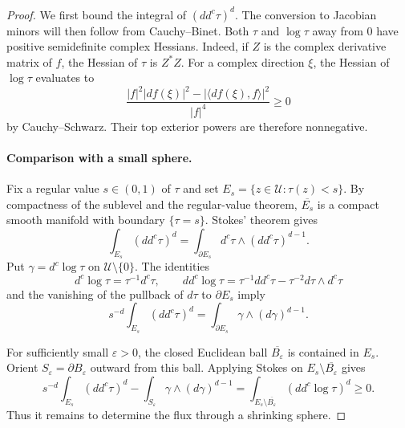 \begin{proof}
We first bound the integral of $(dd^c\tau)^d$. The conversion to Jacobian minors will then follow from Cauchy--Binet. Both $\tau$ and $\log\tau$ away from $0$ have positive semidefinite complex Hessians. Indeed, if $Z$ is the complex derivative matrix of $f$, the Hessian of $\tau$ is $Z^*Z$. For a complex direction $\xi$, the Hessian of $\log\tau$ evaluates to
\[
\frac{|f|^2|df(\xi)|^2
       -|\langle df(\xi),f\rangle|^2}{|f|^4}\geq0
\]
by Cauchy--Schwarz. Their top exterior powers are therefore nonnegative.

\paragraph{Comparison with a small sphere.}
Fix a regular value $s\in(0,1)$ of $\tau$ and set $E_s=\{z\in\mathcal{U}:\tau(z)<s\}$. By compactness of the sublevel and the regular-value theorem, $\overline{E_s}$ is a compact smooth manifold with boundary $\{\tau=s\}$. Stokes' theorem gives
\[
\int_{E_s}(dd^c\tau)^d
 =\int_{\partial E_s}d^c\tau\wedge(dd^c\tau)^{d-1}.
\]
Put $\gamma=d^c\log\tau$ on $\mathcal{U}\setminus\{0\}$. The identities
\[
d^c\log\tau=\tau^{-1}d^c\tau,
\qquad
dd^c\log\tau=\tau^{-1}dd^c\tau
                 -\tau^{-2}d\tau\wedge d^c\tau
\]
and the vanishing of the pullback of $d\tau$ to $\partial E_s$ imply
\begin{equation}\label{eq:mass-level-flux}
s^{-d}\int_{E_s}(dd^c\tau)^d
 =\int_{\partial E_s}\gamma\wedge(d\gamma)^{d-1}.
\end{equation}

For sufficiently small $\varepsilon>0$, the closed Euclidean ball $\overline{B_\varepsilon}$ is contained in $E_s$. Orient $S_\varepsilon=\partial B_\varepsilon$ outward from this ball. Applying Stokes on $E_s\setminus\overline{B_\varepsilon}$ gives
\begin{equation}\label{eq:mass-punctured-flux}
s^{-d}\int_{E_s}(dd^c\tau)^d
 -\int_{S_\varepsilon}\gamma\wedge(d\gamma)^{d-1}
 =\int_{E_s\setminus\overline{B_\varepsilon}}
                     (dd^c\log\tau)^d\geq0.
\end{equation}
Thus it remains to determine the flux through a shrinking sphere.


\end{proof}
